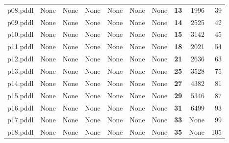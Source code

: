 \documentclass{article}
\begin{document}
\begin{tabular}{@{}lrrrrrrrrr@{}}
p08.pddl & \multicolumn{1}{|l|}{None} & \multicolumn{1}{|l|}{None} & \multicolumn{1}{|l|}{None} & \multicolumn{1}{|l|}{None} & \multicolumn{1}{|l|}{None} & \multicolumn{1}{|l|}{None} & \textbf{13} & 1996 & 39 \\
p09.pddl & \multicolumn{1}{|l|}{None} & \multicolumn{1}{|l|}{None} & \multicolumn{1}{|l|}{None} & \multicolumn{1}{|l|}{None} & \multicolumn{1}{|l|}{None} & \multicolumn{1}{|l|}{None} & \textbf{14} & 2525 & 42 \\
p10.pddl & \multicolumn{1}{|l|}{None} & \multicolumn{1}{|l|}{None} & \multicolumn{1}{|l|}{None} & \multicolumn{1}{|l|}{None} & \multicolumn{1}{|l|}{None} & \multicolumn{1}{|l|}{None} & \textbf{15} & 3142 & 45 \\
p11.pddl & \multicolumn{1}{|l|}{None} & \multicolumn{1}{|l|}{None} & \multicolumn{1}{|l|}{None} & \multicolumn{1}{|l|}{None} & \multicolumn{1}{|l|}{None} & \multicolumn{1}{|l|}{None} & \textbf{18} & 2021 & 54 \\
p12.pddl & \multicolumn{1}{|l|}{None} & \multicolumn{1}{|l|}{None} & \multicolumn{1}{|l|}{None} & \multicolumn{1}{|l|}{None} & \multicolumn{1}{|l|}{None} & \multicolumn{1}{|l|}{None} & \textbf{21} & 2636 & 63 \\
p13.pddl & \multicolumn{1}{|l|}{None} & \multicolumn{1}{|l|}{None} & \multicolumn{1}{|l|}{None} & \multicolumn{1}{|l|}{None} & \multicolumn{1}{|l|}{None} & \multicolumn{1}{|l|}{None} & \textbf{25} & 3528 & 75 \\
p14.pddl & \multicolumn{1}{|l|}{None} & \multicolumn{1}{|l|}{None} & \multicolumn{1}{|l|}{None} & \multicolumn{1}{|l|}{None} & \multicolumn{1}{|l|}{None} & \multicolumn{1}{|l|}{None} & \textbf{27} & 4382 & 81 \\
p15.pddl & \multicolumn{1}{|l|}{None} & \multicolumn{1}{|l|}{None} & \multicolumn{1}{|l|}{None} & \multicolumn{1}{|l|}{None} & \multicolumn{1}{|l|}{None} & \multicolumn{1}{|l|}{None} & \textbf{29} & 5346 & 87 \\
p16.pddl & \multicolumn{1}{|l|}{None} & \multicolumn{1}{|l|}{None} & \multicolumn{1}{|l|}{None} & \multicolumn{1}{|l|}{None} & \multicolumn{1}{|l|}{None} & \multicolumn{1}{|l|}{None} & \textbf{31} & 6499 & 93 \\
p17.pddl & \multicolumn{1}{|l|}{None} & \multicolumn{1}{|l|}{None} & \multicolumn{1}{|l|}{None} & \multicolumn{1}{|l|}{None} & \multicolumn{1}{|l|}{None} & \multicolumn{1}{|l|}{None} & \textbf{33} & \multicolumn{1}{|l|}{None} & 99 \\
p18.pddl & \multicolumn{1}{|l|}{None} & \multicolumn{1}{|l|}{None} & \multicolumn{1}{|l|}{None} & \multicolumn{1}{|l|}{None} & \multicolumn{1}{|l|}{None} & \multicolumn{1}{|l|}{None} & \textbf{35} & \multicolumn{1}{|l|}{None} & 105 \\

\end{tabular}
\end{document}
